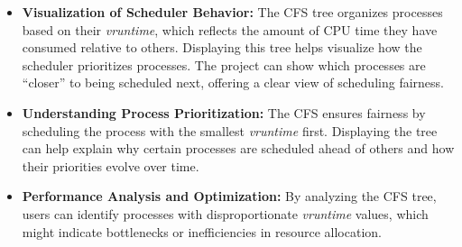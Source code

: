 \documentclass[12pt]{article}
\begin{document}
\begin{itemize}
    \item \textbf{Visualization of Scheduler Behavior:} 
    The CFS tree organizes processes based on their \textit{vruntime}, which reflects the amount of CPU time they have consumed relative to others. Displaying this tree helps visualize how the scheduler prioritizes processes. The project can show which processes are ``closer'' to being scheduled next, offering a clear view of scheduling fairness.

    \item \textbf{Understanding Process Prioritization:} 
    The CFS ensures fairness by scheduling the process with the smallest \textit{vruntime} first. Displaying the tree can help explain why certain processes are scheduled ahead of others and how their priorities evolve over time.

    \item \textbf{Performance Analysis and Optimization:} 
    By analyzing the CFS tree, users can identify processes with disproportionate \textit{vruntime} values, which might indicate bottlenecks or inefficiencies in resource allocation.
\end{itemize}
\end{document}
